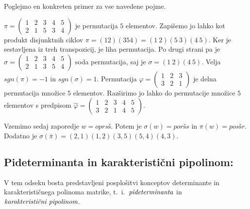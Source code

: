 \documentclass[mat1]{fmfdelo}
\newcommand{\pojem}[1]{\ensuremath{\emph{#1}}}
\begin{document}
Poglejmo en konkreten primer za vse navedene pojme.
\begin{zgled}
$\pi = \begin{pmatrix}
	1 & 2 & 3 & 4 & 5 \\
	2 & 1 & 5 & 3 & 4
\end{pmatrix}$ je permutacija $5$ elementov. Zapišemo jo lahko kot produkt disjunktnih ciklov $\pi = (1 2)(3 5 4) = (1~2)(5~3)(4~5)$. Ker je sestavljena iz treh transpozicij, je liha permutacija. Po drugi strani pa je $\sigma = \begin{pmatrix}
1 & 2 & 3 & 4 & 5 \\
2 & 1 & 3 & 5 & 4
\end{pmatrix}$ soda permutacija, saj je $\sigma = (1~2)(4~5)$. Velja $sgn(\pi) = -1$ in $sgn(\sigma) = 1$. Permutacija $\varphi = \begin{pmatrix}
1 & 2 & 3 \\
3 & 2 & 1
\end{pmatrix}$ je delna permutacija množice $5$ elementov. Razširimo jo lahko do permutacije množice $5$ elementov s predpisom $\hat{\varphi} = \begin{pmatrix}
1 & 2 & 3 & 4 & 5 \\
3 & 2 & 1 & 4 & 5
\end{pmatrix}$.

Vzemimo sedaj zaporedje $w = oprsš$. Potem je $\sigma(w) = poršs$ in $\pi(w) = posšr$. Dodatno je $\sigma(\bar{\pi}) = (2, 1)(1, 2)(3, 5)(5, 4)(4, 3)$.
\end{zgled}

\subsection{Pideterminanta in karakteristični pipolinom:}\label{subsect:pidetinpipoly}
V tem odseku bosta predstavljeni posplošitvi konceptov determinante in karakterističnega polinoma matrike, t.~i.~\pojem{pideterminanta} in \pojem{karakteristični pipolinom}.
\end{document}
